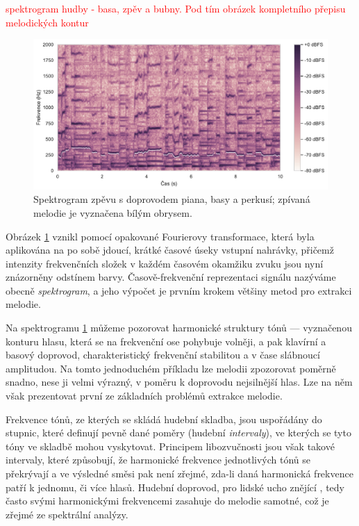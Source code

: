 \textcolor{red}{spektrogram hudby - basa, zpěv a bubny. Pod tím obrázek kompletního přepisu melodických kontur}

\begin{figure}[h]\centering
\includegraphics[width=\textwidth,height=\textheight,keepaspectratio]{../img/audio_mix_stft}
\caption{Spektrogram zpěvu s doprovodem piana, basy a perkusí; zpívaná melodie je vyznačena bílým obrysem.}
\label{obr:audio_mix_stft}
\end{figure}

Obrázek \ref{obr:audio_mix_stft} vznikl pomocí opakované Fourierovy transformace, která byla aplikována na po sobě jdoucí, krátké časové úseky vstupní nahrávky, přičemž intenzity frekvenčních složek v každém časovém okamžiku zvuku jsou nyní znázorněny odstínem barvy. Časově-frekvenční reprezentaci signálu nazýváme obecně \emph{spektrogram}, a jeho výpočet je prvním krokem většiny metod pro extrakci melodie.

Na spektrogramu \ref{obr:audio_mix_stft} můžeme pozorovat harmonické struktury tónů --- vyznačenou konturu hlasu, která se na frekvenční ose pohybuje volněji, a pak klavírní a basový doprovod, charakteristický frekvenční stabilitou a v čase slábnoucí amplitudou. Na tomto jednoduchém příkladu lze melodii zpozorovat poměrně snadno, nese ji velmi výrazný, v poměru k doprovodu nejsilnější hlas. Lze na něm však prezentovat první ze základních problémů extrakce melodie.

Frekvence tónů, ze kterých se skládá hudební skladba, jsou uspořádány do stupnic, které definují pevně dané poměry (hudební \emph{intervaly}), ve kterých se tyto tóny ve skladbě mohou vyskytovat. Principem libozvučnosti jsou však takové intervaly, které způsobují, že harmonické frekvence jednotlivých tónů se překrývají a ve výsledné směsi pak není zřejmé, zda-li daná harmonická frekvence patří k jednomu, či více hlasů. Hudební doprovod, pro lidské ucho znějící , tedy často svými harmonickými frekvencemi zasahuje do melodie samotné, což je zřejmé ze spektrální analýzy.

